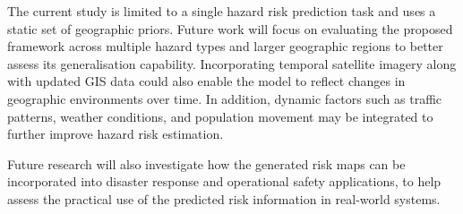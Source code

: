 \documentclass[sigconf, review=true]{acmart}
\begin{document}
The current study is limited to a single hazard risk prediction task and uses a static set of geographic priors. Future work will focus on evaluating the proposed framework across multiple hazard types and larger geographic regions to better assess its generalisation capability. Incorporating temporal satellite imagery along with updated GIS data could also enable the model to reflect changes in geographic environments over time. In addition, dynamic factors such as traffic patterns, weather conditions, and population movement may be integrated to further improve hazard risk estimation.

Future research will also investigate how the generated risk maps can be incorporated into disaster response and operational safety applications, to help assess the practical use of the predicted risk information in real-world systems.



\end{document}
